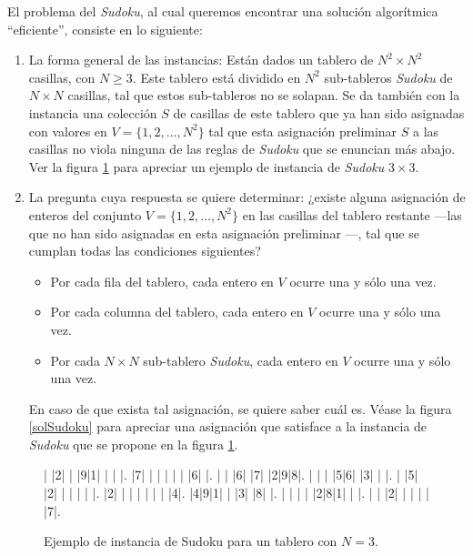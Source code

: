 \documentclass[12pt,lettersize,oneside]{article}
\begin{document}
El problema del \emph{Sudoku}, al cual queremos encontrar una solución
algorítmica ``eficiente'', consiste en lo siguiente:\vspace{-2.5mm}
\begin{enumerate}
\item La forma general de las instancias: Están dados un tablero de $N^2 \times
  N^2$ casillas, con $N\geq 3$. Este tablero está dividido en $N^2$ sub-tableros
  \emph{Sudoku} de $N \times N$ casillas, tal que estos sub-tableros no se
  solapan. Se da también con la instancia una colección $S$ de casillas de este
  tablero que ya han sido asignadas con valores en $V=\{1,2,\ldots,N^2\}$ tal
  que esta asignación preliminar $S$ a las casillas no viola ninguna de las
  reglas de \emph{Sudoku} que se enuncian más abajo. Ver la figura
  \ref{instanciaSudoku} para apreciar un ejemplo de instancia de \emph{Sudoku}
  $3 \times 3$.

\item La pregunta cuya respuesta se quiere determinar: ¿existe alguna asignación
  de enteros del conjunto $V=\{1,2,\ldots,N^2\}$ en las casillas del tablero
  restante ---las que no han sido asignadas en esta asignación preliminar ---,
  tal que se cumplan todas las condiciones siguientes?
    \begin{itemize}
    \item Por cada fila del tablero, cada entero en $V$ ocurre una y sólo una
      vez.
    \item Por cada columna del tablero, cada entero en $V$ ocurre una y sólo una
      vez.
    \item Por cada $N \times N$ sub-tablero \emph{Sudoku}, cada entero en $V$
      ocurre una y sólo una vez.
    \end{itemize}
    En caso de que exista tal asignación, se quiere saber cuál es. Véase la
    figura \ref{solSudoku} para apreciar una asignación que satisface a la
    instancia de \emph{Sudoku} que se propone en la figura
    \ref{instanciaSudoku}. 
\end{enumerate}
\begin{figure}\caption{Ejemplo de instancia de Sudoku para un tablero con $N=3$.}
\label{instanciaSudoku}
\setlength\sudokusize{6.5cm}
\begin{sudoku}
| |2| | |9|1| | | |.
|7| | | | | | |6| |.
| | |6| |7| |2|9|8|.
| | | |5|6| |3| | |.
| |5| |2| | | | | |.
|2| | | | | | | |4|.
|4|9|1| | |3| |8| |.
| | | | |2|8|1| | |.
| | |2| | | | | |7|.
\end{sudoku}
\end{figure}
\end{document}
